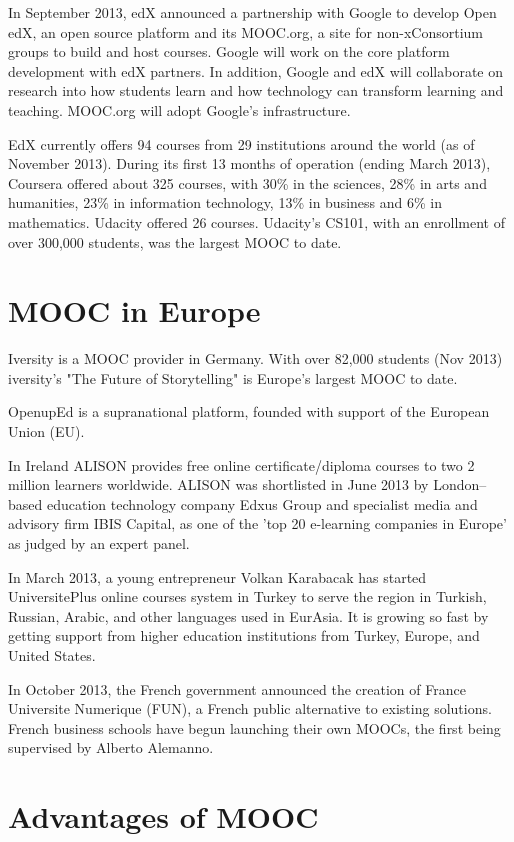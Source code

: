 In September 2013, edX announced a partnership with Google to develop Open edX,
an open source platform and its MOOC.org, a site for non-xConsortium groups to
build and host courses. Google will work on the core platform development with
edX partners. In addition, Google and edX will collaborate on research into how
students learn and how technology can transform learning and teaching. MOOC.org
will adopt Google's infrastructure.

EdX currently offers 94 courses from 29 institutions around the world (as of
November 2013). During its first 13 months of operation (ending March 2013),
Coursera offered about 325 courses, with 30\% in the sciences, 28\% in arts and
humanities, 23\% in information technology, 13\% in business and 6\% in
mathematics. Udacity offered 26 courses. Udacity's CS101, with an enrollment
of over 300,000 students, was the largest MOOC to date.

\section{MOOC in Europe}
Iversity is a MOOC provider in Germany. With over 82,000 students (Nov 2013)
iversity's "The Future of Storytelling" is Europe's largest MOOC to date.

OpenupEd is a supranational platform, founded with support of the European
Union (EU).

In Ireland ALISON provides free online certificate/diploma courses to two 2
million learners worldwide. ALISON was shortlisted in June 2013 by
London–based education technology company Edxus Group and specialist media and
advisory firm IBIS Capital, as one of the 'top 20 e-learning companies in
Europe' as judged by an expert panel.

In March 2013, a young entrepreneur Volkan Karabacak has started UniversitePlus
online courses system in Turkey to serve the region in Turkish, Russian, Arabic,
and other languages used in EurAsia. It is growing so fast by getting support
from higher education institutions from Turkey, Europe, and United States.

In October 2013, the French government announced the creation of France
Universite Numerique (FUN), a French public alternative to existing solutions.
French business schools have begun launching their own MOOCs, the first being
supervised by Alberto Alemanno.
\section{Advantages of MOOC}

